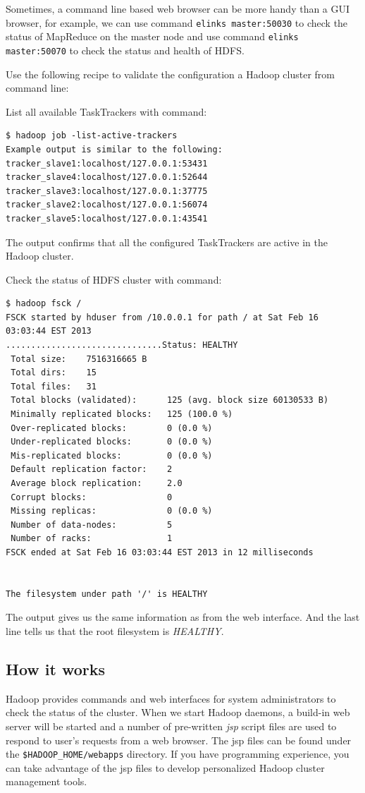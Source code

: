 Sometimes, a command line based web browser can be more handy than a GUI browser, for example, we can use command \verb|elinks master:50030| to check the status of MapReduce on the master node and use command \verb|elinks master:50070| to check the status and health of HDFS.

Use the following recipe to validate the configuration a Hadoop cluster from command line:

List all available TaskTrackers with command:
\lstset{style=bashstyle}
\begin{lstlisting}
$ hadoop job -list-active-trackers
Example output is similar to the following:
tracker_slave1:localhost/127.0.0.1:53431
tracker_slave4:localhost/127.0.0.1:52644
tracker_slave3:localhost/127.0.0.1:37775
tracker_slave2:localhost/127.0.0.1:56074
tracker_slave5:localhost/127.0.0.1:43541
\end{lstlisting}

The output confirms that all the configured TaskTrackers are active in the Hadoop cluster.

Check the status of HDFS cluster with command:
\lstset{style=bashstyle}
\begin{lstlisting}
$ hadoop fsck /
FSCK started by hduser from /10.0.0.1 for path / at Sat Feb 16 03:03:44 EST 2013
...............................Status: HEALTHY
 Total size:    7516316665 B
 Total dirs:    15
 Total files:   31
 Total blocks (validated):      125 (avg. block size 60130533 B)
 Minimally replicated blocks:   125 (100.0 %)
 Over-replicated blocks:        0 (0.0 %)
 Under-replicated blocks:       0 (0.0 %)
 Mis-replicated blocks:         0 (0.0 %)
 Default replication factor:    2
 Average block replication:     2.0
 Corrupt blocks:                0
 Missing replicas:              0 (0.0 %)
 Number of data-nodes:          5
 Number of racks:               1
FSCK ended at Sat Feb 16 03:03:44 EST 2013 in 12 milliseconds


The filesystem under path '/' is HEALTHY
\end{lstlisting}

The output gives us the same information as from the web interface. And the last line tells us that the root filesystem is \emph{HEALTHY}.
\subsection*{How it works}
Hadoop provides commands and web interfaces for system administrators to check the status of the cluster. When we start Hadoop daemons, a build-in web server will be started and a number of pre-written \emph{jsp} script files are used to respond to user's requests from a web browser. The jsp files can be found under the \verb|$HADOOP_HOME/webapps| directory. If you have programming experience, you can take advantage of the jsp files to develop personalized Hadoop cluster management tools.

